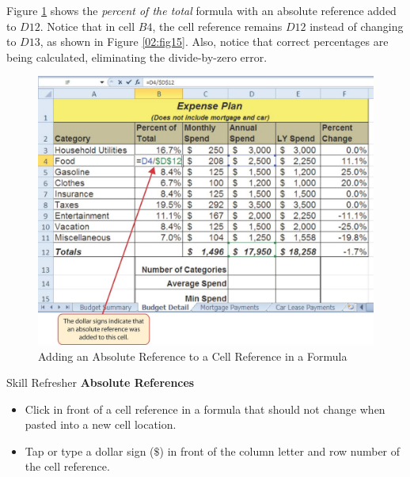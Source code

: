 Figure \ref{02:fig16} shows the \textit{percent of the total} formula with an absolute reference added to $ D12 $. Notice that in cell $ B4 $, the cell reference remains $ D12 $ instead of changing to $ D13 $, as shown in Figure \ref{02:fig15}. Also, notice that correct percentages are being calculated, eliminating the divide-by-zero error.

\begin{figure}[H]
	\centering
	\includegraphics[width=\maxwidth{.95\linewidth}]{gfx/ch02_fig16}
	\caption{Adding an Absolute Reference to a Cell Reference in a Formula}
	\label{02:fig16}
\end{figure}

\begin{center}
	\begin{sklbox}{Skill Refresher}
		\textbf{Absolute References}
		\\
		\begin{itemize}
			\setlength{\itemsep}{0pt}
			\setlength{\parskip}{0pt}
			\setlength{\parsep}{0pt}
			
			\item Click in front of a cell reference in a formula that should not change when pasted into a new cell location.
			\item Tap  or type a dollar sign ($ \$ $) in front of the column letter and row number of the cell reference.

		\end{itemize}
	\end{sklbox}
\end{center}

